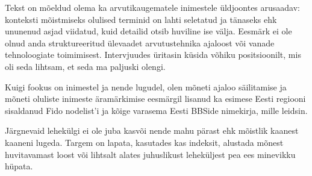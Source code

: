 Tekst on mõeldud olema ka arvutikaugematele inimestele üldjoontes arusaadav: 
konteksti mõistmiseks olulised terminid on lahti seletatud ja tänaseks ehk 
ununenud asjad viidatud, kuid detailid otsib huviline ise välja. Eesmärk ei ole 
olnud anda struktureeritud ülevaadet arvutustehnika ajaloost või vanade 
tehnoloogiate toimimisest. Intervjuudes üritasin küsida võhiku 
positsioonilt, mis oli seda lihtsam, et seda ma paljuski olengi.

Kuigi fookus on inimestel ja nende lugudel, olen mõneti ajaloo säilitamise ja 
mõneti oluliste inimeste äramärkimise eesmärgil lisanud ka esimese Eesti regiooni
sisaldanud Fido nodelist'i ja kõige varasema Eesti BBSide nimekirja, mille 
leidsin.

Järgnevaid lehekülgi ei ole juba kasvõi nende mahu pärast ehk mõistlik kaanest 
kaaneni lugeda. Targem on lapata, kasutades kas indeksit, 
alustada mõnest huvitavamast loost või lihtsalt alates juhuslikust leheküljest 
pea ees minevikku hüpata.

